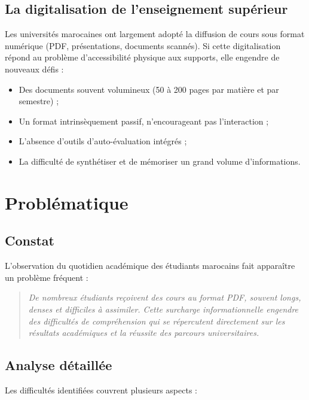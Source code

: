 \subsection{La digitalisation de l'enseignement supérieur}

Les universités marocaines ont largement adopté la diffusion de cours sous format numérique (PDF, présentations, documents scannés). Si cette digitalisation répond au problème d'accessibilité physique aux supports, elle engendre de nouveaux défis :

\begin{itemize}
  \item Des documents souvent volumineux (50 à 200 pages par matière et par semestre) ;
  \item Un format intrinsèquement passif, n'encourageant pas l'interaction ;
  \item L'absence d'outils d'auto-évaluation intégrés ;
  \item La difficulté de synthétiser et de mémoriser un grand volume d'informations.
\end{itemize}

\section{Problématique}

\subsection{Constat}

L'observation du quotidien académique des étudiants marocains fait apparaître un problème fréquent :

\begin{quote}
\textit{\og De nombreux étudiants reçoivent des cours au format PDF, souvent longs, denses et difficiles à assimiler. Cette surcharge informationnelle engendre des difficultés de compréhension qui se répercutent directement sur les résultats académiques et la réussite des parcours universitaires. \fg{}}
\end{quote}

\subsection{Analyse détaillée}

Les difficultés identifiées couvrent plusieurs aspects :

